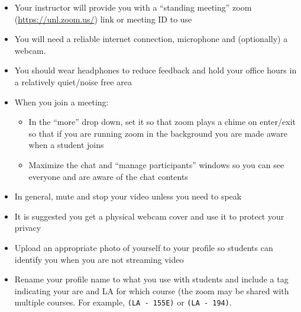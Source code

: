 \documentclass[12pt]{scrartcl}
\begin{document}
\begin{itemize}
  \item Your instructor will provide you with a ``standing meeting'' 
  zoom (\url{https://unl.zoom.us/}) link or meeting ID to use 
  \item You will need a reliable internet connection, microphone and 
  (optionally) a webcam.
  \item You should wear headphones to reduce feedback and hold your 
  office hours in a relatively quiet/noise free area
  \item When you join a meeting:
  \begin{itemize} 
    \item In the ``more'' drop down, set it so that zoom plays a chime on 
    enter/exit so that if you are running zoom in the background you are 
    made aware when a student joins
    \item Maximize the chat and ``manage participants'' windows so you can 
    see everyone and are aware of the chat contents
  \end{itemize}
  \item In general, mute and stop your video unless you need to speak
  \item It is suggested you get a physical webcam cover and use it to protect your privacy
  \item Upload an appropriate photo of yourself to your profile so students can identify you when you are not streaming video
  \item Rename your profile name to what you use with students and include a tag indicating your are and LA for which course (the zoom may be shared with multiple courses.  For example, \texttt{(LA - 155E)} or \texttt{(LA - 194)}.


\end{itemize}
\end{document}
